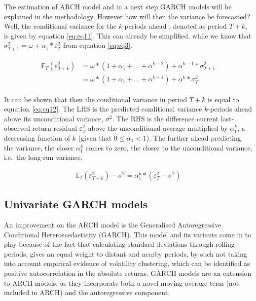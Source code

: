 \documentclass[a4paper, twoside]{templates/ociamthesis}
\begin{document}
\noindent The estimation of ARCH model and in a next step GARCH models will be explained in the methodology. However how will then the variance be forecasted? Well, the conditional variance for the \(k\)-periods ahead , denoted as period \(T+k\), is given by equation \eqref{eq:eq11}. This can already be simplified, while we know that \(\sigma_{T+1}^2 = \omega + \alpha_1 * \varepsilon_T^2\) from equation \eqref{eq:eq3}.

\begin{align} 
\begin{split}
\mathbb{E}_T(\varepsilon_{T+k}^2) 
&= \omega*(1+\alpha_1 + ... + \alpha^{k-2}) + \alpha^{k-1}*\sigma_{T+1}^2 \\
&= \omega*(1+\alpha_1 + ... + \alpha^{k-1}) + \alpha^{k}*\sigma_{T}^2
\end{split}
 \label{eq:eq11}
\end{align}

\noindent It can be shown that then the conditional variance in period \(T+k\) is equal to equation \eqref{eq:eq12}. The LHS is the predicted conditional variance \(k\)-periods ahead above its unconditional variance, \(\sigma^2\). The RHS is the difference current last-observed return residual \(\varepsilon_T^2\) above the unconditional average multiplied by \(\alpha_1^k\), a decreasing function of \(k\) (given that \(0 \le\alpha_1 <1\)). The further ahead predicting the variance, the closer \(\alpha_1^k\) comes to zero, the closer to the unconditional variance, i.e.~the long-run variance.

\begin{align} 
\mathbb{E}_T(\varepsilon_{T+k}^2) - \sigma^2 = \alpha_1^k*(\varepsilon_T^2 - \sigma^2)
 \label{eq:eq12}
\end{align}

\newpage

\hypertarget{univariate-garch-models}{%
\subsection{Univariate GARCH models}\label{univariate-garch-models}}

\noindent An improvement on the ARCH model is the Generalised Autoregressive Conditional Heteroscedasticity (GARCH). This model and its variants come in to play because of the fact that calculating standard deviations through rolling periods, gives an equal weight to distant and nearby periods, by such not taking into account empirical evidence of volatility clustering, which can be identified as positive autocorrelation in the absolute returns. GARCH models are an extension to ARCH models, as they incorporate both a novel moving average term (not included in ARCH) and the autoregressive component.~\\
\end{document}
